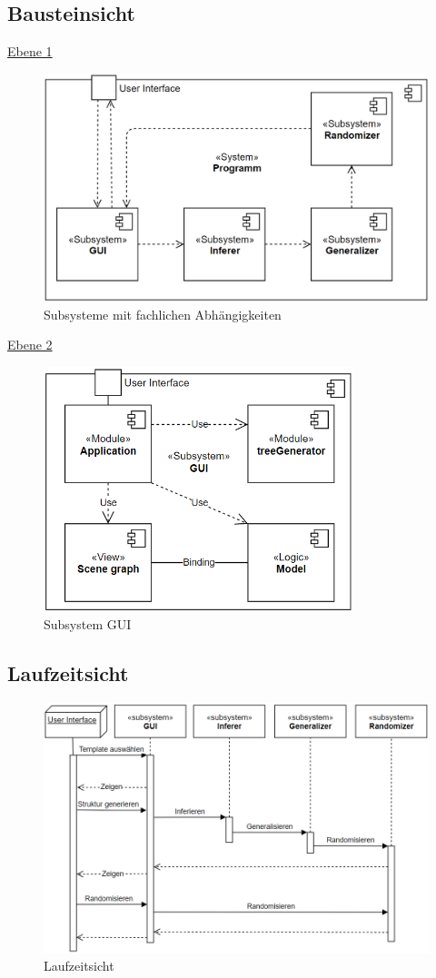 \subsection{Bausteinsicht}
\underline{Ebene 1}
\begin{figure}[H]
    \centering
    \includegraphics[width=12cm]{../images/Bausteinsicht_Ebene_1.PNG}
    \caption{Subsysteme mit fachlichen Abhängigkeiten}
\end{figure}
\underline{Ebene 2}
\begin{figure}[H]
    \centering
    \includegraphics[width=9cm]{../images/Bausteinsicht_Ebene_2.PNG}
    \caption{Subsystem GUI}
\end{figure}

\subsection{Laufzeitsicht}
\begin{figure}[H]
    \centering
    \includegraphics[width=14cm]{../images/Laufzeitsicht.PNG}
    \caption{Laufzeitsicht}
\end{figure}

